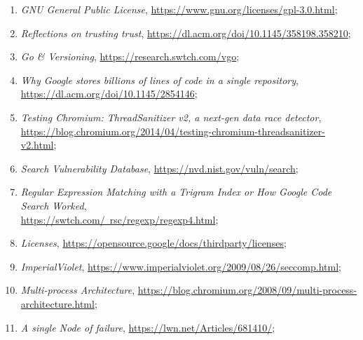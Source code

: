 \documentclass[a4paper,11pt]{article}
\begin{document}
\begin{enumerate}
\item \emph{GNU General Public License},
  \href{https://www.gnu.org/licenses/gpl-3.0.html}{https://www.gnu.org/licenses/gpl-3.0.html};

\item \emph{Reflections on trusting trust},
  \href{https://dl.acm.org/doi/10.1145/358198.358210}{https://dl.acm.org/doi/10.1145/358198.358210};

\item \emph{Go \& Versioning},
  \href{https://research.swtch.com/vgo}{https://research.swtch.com/vgo};

\item \emph{Why Google stores billions of lines of code in a single
    repository},
  \href{https://dl.acm.org/doi/10.1145/2854146}{https://dl.acm.org/doi/10.1145/2854146};

\item \emph{Testing Chromium: ThreadSanitizer v2, a next-gen data race
    detector}, \\
  \href{https://blog.chromium.org/2014/04/testing-chromium-threadsanitizer-v2.html}{https://blog.chromium.org/2014/04/testing-chromium-threadsanitizer-v2.html};

\item \emph{Search Vulnerability Database},
  \href{https://nvd.nist.gov/vuln/search}{https://nvd.nist.gov/vuln/search};

\item \emph{Regular Expression Matching with a Trigram Index or How
    Google Code Search Worked}, \\
  \href{https://swtch.com/~rsc/regexp/regexp4.html}{https://swtch.com/~rsc/regexp/regexp4.html};

\item \emph{Licenses},
  \href{https://opensource.google/docs/thirdparty/licenses}{https://opensource.google/docs/thirdparty/licenses};

\item \emph{ImperialViolet},
  \href{https://www.imperialviolet.org/2009/08/26/seccomp.html}{https://www.imperialviolet.org/2009/08/26/seccomp.html};

\item \emph{Multi-process Architecture},
  \href{https://blog.chromium.org/2008/09/multi-process-architecture.html}{https://blog.chromium.org/2008/09/multi-process-architecture.html};

\item \emph{A single Node of failure},
  \href{https://lwn.net/Articles/681410/}{https://lwn.net/Articles/681410/};


\end{enumerate}
\end{document}
